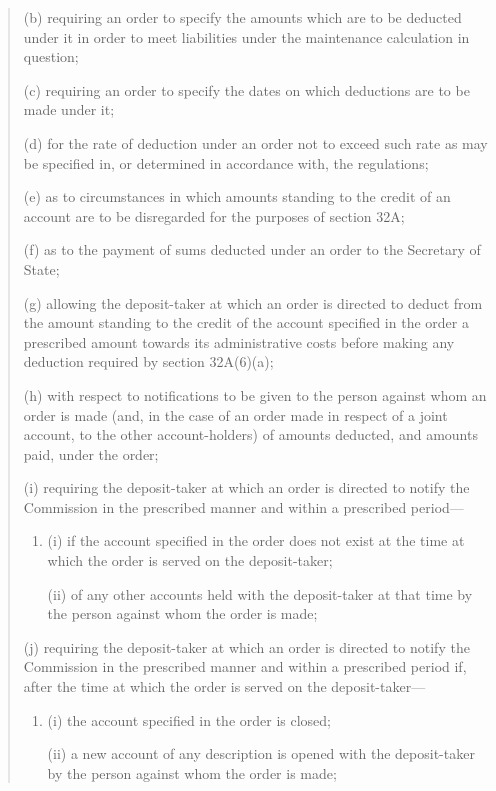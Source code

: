 \documentclass[a4paper]{article}
\begin{document}
\begin{quotation}
\begin{enumerate}
(b) requiring an order to specify the amounts which are to be deducted under it
in order to meet liabilities under the maintenance calculation in question;

(c) requiring an order to specify the dates on which deductions are to be made
under it;

(d) for the rate of deduction under an order not to exceed such rate as may be
specified in, or determined in accordance with, the regulations;

(e) as to circumstances in which amounts standing to the credit of an account
are to be disregarded for the purposes of section 32A;

(f) as to the payment of sums deducted under an order to the Secretary of
State;

(g) allowing the deposit-taker at which an order is directed to deduct from the
amount standing to the credit of the account specified in the order a prescribed
amount towards its administrative costs before making any deduction required
by section 32A(6)(a);

(h) with respect to notifications to be given to the person against whom an order
is made (and, in the case of an order made in respect of a joint account, to the
other account-holders) of amounts deducted, and amounts paid, under the
order;

(i) requiring the deposit-taker at which an order is directed to notify the
Commission in the prescribed manner and within a prescribed period---
\begin{enumerate}\item[]
(i)
if the account specified in the order does not exist at the time at which
the order is served on the deposit-taker;

(ii)
of any other accounts held with the deposit-taker at that time by the
person against whom the order is made;
\end{enumerate}

(j) requiring the deposit-taker at which an order is directed to notify the
Commission in the prescribed manner and within a prescribed period
if, after the time at which the order is served on the deposit-taker---
\begin{enumerate}\item[]
(i) the account specified in the order is closed;

(ii) a new account of any description is opened with the deposit-taker by
the person against whom the order is made;
\end{enumerate}


\end{enumerate}
\end{quotation}
\end{document}

